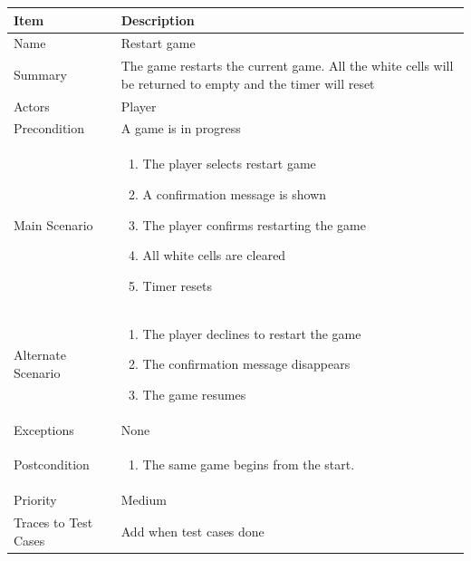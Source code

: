 \documentclass[12pt]{article}
\begin{document}
\begin{center}
\setlength{\tabcolsep}{18pt}
\renewcommand{\arraystretch}{1.3}
\begin{tabular}{ |p{3.4cm}|p{10cm}| }
    \hline
    
   \textbf{Item} & \textbf{Description} \\
    \hline
    Name & Restart game \\
    \hline
    Summary & The game restarts the current game. All the white cells will be returned to empty and the timer will reset \\
    \hline
    Actors & Player \\
    \hline
    Precondition & A game is in progress \\
    \hline
    Main Scenario &     
    \vspace*{-0.1in}
    \begin{enumerate}[leftmargin=0.2in]
    \item The player selects restart game
    \item A confirmation message is shown
    \item The player confirms restarting the game
    \item All white cells are cleared
    \item Timer resets
    \end{enumerate}  \\
    \hline
    Alternate Scenario & \vspace*{-0.1in}
    \begin{enumerate}[leftmargin=0.2in]
    \item The player declines to restart the game
    \item The confirmation message disappears
    \item The game resumes
    \end{enumerate}  \\
    \hline
    Exceptions &  None\\
    \hline
    Postcondition & 
    \vspace*{-0.1in}
    \begin{enumerate}[leftmargin=0.2in]
        \item The same game begins from the start.
    \end{enumerate}  \\
    \hline
    Priority & Medium  \\
    \hline
    \small{Traces to Test Cases} & Add when test cases done  \\
    \hline
\end{tabular}
\end{center}
\end{document}

